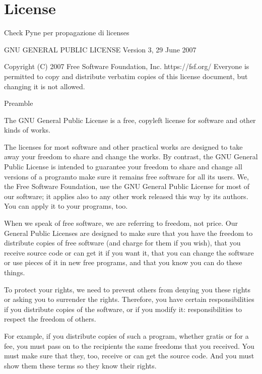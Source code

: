 \documentclass[letterpaper,10pt,english]{sphinxmanual}
\begin{document}
\chapter{License}
\label{\detokenize{LICENSE:license}}\label{\detokenize{LICENSE:id1}}\label{\detokenize{LICENSE::doc}}
Check Pyne per propagazione di licenses

\begin{sphinxVerbatim}[commandchars=\\\{\}]
                    GNU GENERAL PUBLIC LICENSE
                       Version 3, 29 June 2007

 Copyright (C) 2007 Free Software Foundation, Inc. \PYGZlt{}https://fsf.org/\PYGZgt{}
 Everyone is permitted to copy and distribute verbatim copies
 of this license document, but changing it is not allowed.

                            Preamble

  The GNU General Public License is a free, copyleft license for
software and other kinds of works.

  The licenses for most software and other practical works are designed
to take away your freedom to share and change the works.  By contrast,
the GNU General Public License is intended to guarantee your freedom to
share and change all versions of a program\PYGZhy{}\PYGZhy{}to make sure it remains free
software for all its users.  We, the Free Software Foundation, use the
GNU General Public License for most of our software; it applies also to
any other work released this way by its authors.  You can apply it to
your programs, too.

  When we speak of free software, we are referring to freedom, not
price.  Our General Public Licenses are designed to make sure that you
have the freedom to distribute copies of free software (and charge for
them if you wish), that you receive source code or can get it if you
want it, that you can change the software or use pieces of it in new
free programs, and that you know you can do these things.

  To protect your rights, we need to prevent others from denying you
these rights or asking you to surrender the rights.  Therefore, you have
certain responsibilities if you distribute copies of the software, or if
you modify it: responsibilities to respect the freedom of others.

  For example, if you distribute copies of such a program, whether
gratis or for a fee, you must pass on to the recipients the same
freedoms that you received.  You must make sure that they, too, receive
or can get the source code.  And you must show them these terms so they
know their rights.


\end{sphinxVerbatim}
\end{document}
